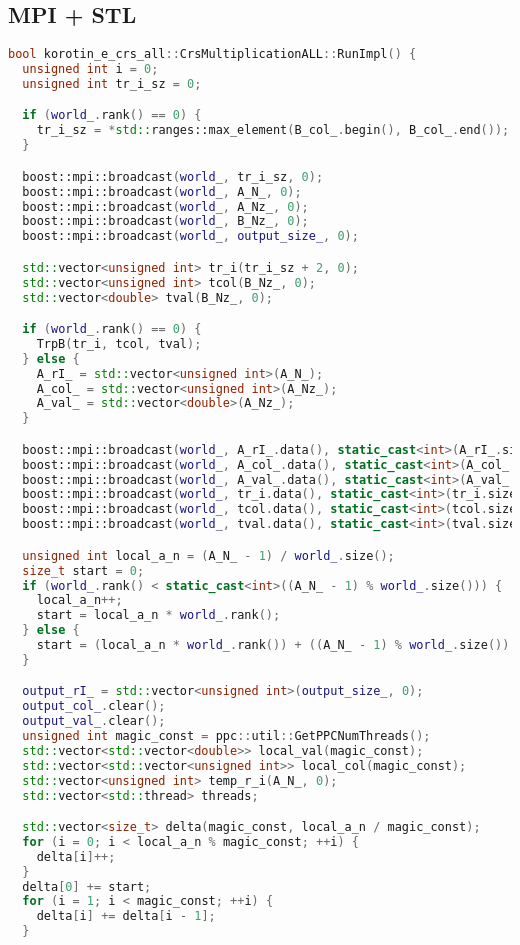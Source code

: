 \documentclass[a4paper,12pt]{article}
\begin{document}
\subsection{MPI + STL}
\begin{lstlisting}[language=C++]
bool korotin_e_crs_all::CrsMultiplicationALL::RunImpl() {
  unsigned int i = 0;
  unsigned int tr_i_sz = 0;

  if (world_.rank() == 0) {
    tr_i_sz = *std::ranges::max_element(B_col_.begin(), B_col_.end());
  }

  boost::mpi::broadcast(world_, tr_i_sz, 0);
  boost::mpi::broadcast(world_, A_N_, 0);
  boost::mpi::broadcast(world_, A_Nz_, 0);
  boost::mpi::broadcast(world_, B_Nz_, 0);
  boost::mpi::broadcast(world_, output_size_, 0);

  std::vector<unsigned int> tr_i(tr_i_sz + 2, 0);
  std::vector<unsigned int> tcol(B_Nz_, 0);
  std::vector<double> tval(B_Nz_, 0);

  if (world_.rank() == 0) {
    TrpB(tr_i, tcol, tval);
  } else {
    A_rI_ = std::vector<unsigned int>(A_N_);
    A_col_ = std::vector<unsigned int>(A_Nz_);
    A_val_ = std::vector<double>(A_Nz_);
  }

  boost::mpi::broadcast(world_, A_rI_.data(), static_cast<int>(A_rI_.size()), 0);
  boost::mpi::broadcast(world_, A_col_.data(), static_cast<int>(A_col_.size()), 0);
  boost::mpi::broadcast(world_, A_val_.data(), static_cast<int>(A_val_.size()), 0);
  boost::mpi::broadcast(world_, tr_i.data(), static_cast<int>(tr_i.size()), 0);
  boost::mpi::broadcast(world_, tcol.data(), static_cast<int>(tcol.size()), 0);
  boost::mpi::broadcast(world_, tval.data(), static_cast<int>(tval.size()), 0);

  unsigned int local_a_n = (A_N_ - 1) / world_.size();
  size_t start = 0;
  if (world_.rank() < static_cast<int>((A_N_ - 1) % world_.size())) {
    local_a_n++;
    start = local_a_n * world_.rank();
  } else {
    start = (local_a_n * world_.rank()) + ((A_N_ - 1) % world_.size());
  }

  output_rI_ = std::vector<unsigned int>(output_size_, 0);
  output_col_.clear();
  output_val_.clear();
  unsigned int magic_const = ppc::util::GetPPCNumThreads();
  std::vector<std::vector<double>> local_val(magic_const);
  std::vector<std::vector<unsigned int>> local_col(magic_const);
  std::vector<unsigned int> temp_r_i(A_N_, 0);
  std::vector<std::thread> threads;

  std::vector<size_t> delta(magic_const, local_a_n / magic_const);
  for (i = 0; i < local_a_n % magic_const; ++i) {
    delta[i]++;
  }
  delta[0] += start;
  for (i = 1; i < magic_const; ++i) {
    delta[i] += delta[i - 1];
  }


\end{lstlisting}
\end{document}

